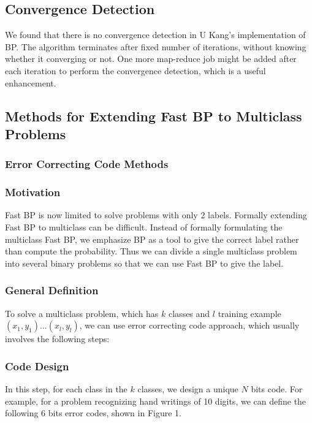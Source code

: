 \subsection{Convergence Detection}
We found that there is no convergence detection in U Kang's implementation of BP. The algorithm terminates after fixed number of iterations, without knowing whether it converging or not. One more map-reduce job might be added after each iteration to perform the convergence detection, which is a useful enhancement.

\subsection{Methods for Extending Fast BP to Multiclass Problems}

\subsubsection{Error Correcting Code Methods}

\subsubsection*{Motivation}
Fast BP is now limited to solve problems with only 2 labels. Formally extending Fast BP to multiclass can be difficult. Instead of formally formulating the multiclass Fast BP, we emphasize BP as a tool to give the correct label rather than compute the probability. Thus we can divide a single multiclass problem into several binary problems so that we can use Fast BP to give the label.


\subsubsection*{General Definition}

To solve a multiclass problem, which has $k$ classes and $l$ training example $(x_{1},y_{1})...(x_{l},y_{l})$, we can use error correcting code approach, which usually involves the following steps:

\subsubsection*{Code Design}

In this step, for each class in the $k$ classes, we design a unique $N$ bits code. For example, for a problem recognizing hand writings of 10 digits, we can define the following 6 bits error codes, shown in Figure 1.

